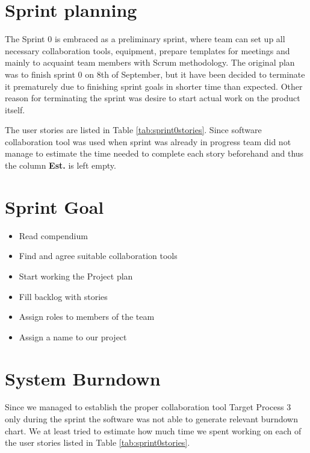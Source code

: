 \section{Sprint planning}
The Sprint 0 is embraced as a preliminary sprint, where team can set up all necessary collaboration tools, equipment, prepare templates for meetings and mainly to acquaint team members with Scrum methodology. The original plan was to finish sprint 0 on 8th of September, but it have been decided to terminate it prematurely due to finishing sprint goals in shorter time than expected. Other reason for terminating the sprint was desire to start actual work on the product itself.

The user stories are listed in Table \ref{tab:sprint0stories}. Since software collaboration tool was used when sprint was already in progress team did not manage to estimate the time needed to complete each story beforehand and thus the column \textbf{Est.} is left empty.




\section{Sprint Goal}
\begin{itemize}
    \item Read compendium
    \item Find and agree suitable collaboration tools
    \item Start working the Project plan
    \item Fill backlog with stories
    \item Assign roles to members of the team
    \item Assign a name to our project
\end{itemize}

\section{System Burndown}
Since we managed to establish the proper collaboration tool Target Process 3 only during the sprint the software was not able to generate relevant burndown chart.
We at least tried to estimate how much time we spent working on each of the user stories listed in Table \ref{tab:sprint0stories}.

